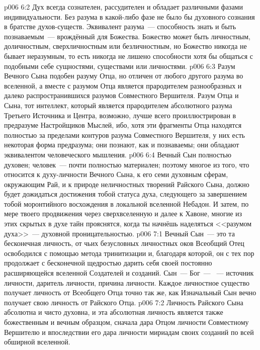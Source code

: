 \vs p006 6:2 Дух всегда сознателен, рассудителен и обладает различными фазами индивидуальности. Без разума в какой\hyp{}либо фазе не было бы духовного сознания в братстве духов\hyp{}существ. Эквивалент разума~--- способность знать и быть познаваемым~--- врождённый для Божества. Божество может быть личностным, доличностным, сверхличностным или безличностным, но Божество никогда не бывает неразумным, то есть никогда не лишено способности хотя бы общаться с подобными себе сущностями, существами или личностями.
\vs p006 6:3 Разум Вечного Сына подобен разуму Отца, но отличен от любого другого разума во вселенной, а вместе с разумом Отца является прародителем разнообразных и далеко распространившихся разумов Совместного Вершителя. Разум Отца и Сына, тот интеллект, который является прародителем абсолютного разума Третьего Источника и Центра, возможно, лучше всего проиллюстрирован в предразуме Настройщиков Мыслей, ибо, хотя эти фрагменты Отца находятся полностью за пределами контуров разума Совместного Вершителя, у них есть некоторая форма предразума; они познают, как и познаваемы; они обладают эквивалентом человеческого мышления.
\vs p006 6:4 Вечный Сын полностью духовен; человек~--- почти полностью материален; поэтому многое из того, что относится к духу\hyp{}личности Вечного Сына, к его семи духовным сферам, окружающим Рай, и к природе неличностных творений Райского Сына, должно будет дожидаться достижения тобой статуса духа, следующего за завершением тобой моронтийного восхождения в локальной вселенной Небадон. И затем, по мере твоего продвижения через сверхвселенную и далее к Хавоне, многие из этих скрытых в духе тайн прояснятся, когда ты начнёшь наделяться <<разумом духа>>~--- духовной проницательностью.
\vs p006 7:1 Вечный Сын~--- это та бесконечная личность, от чьих безусловных личностных оков Всеобщий Отец освободился с помощью метода тринитизации и, благодаря которой, он с тех пор продолжает с бесконечной щедростью дарить себя своей постоянно расширяющейся вселенной Создателей и созданий. Сын~---  Бог~--- ~--- источник личности, даритель личности, причина личности. Каждое личностное существо получает личность от Всеобщего Отца точно так же, как Изначальный Сын вечно получает свою личность от Райского Отца.
\vs p006 7:2 Личность Райского Сына абсолютна и чисто духовна, и эта абсолютная личность является также божественным и вечным образцом, сначала дара Отцом личности Совместному Вершителю и впоследствии его дара личности мириадам своих созданий по всей обширной вселенной.
